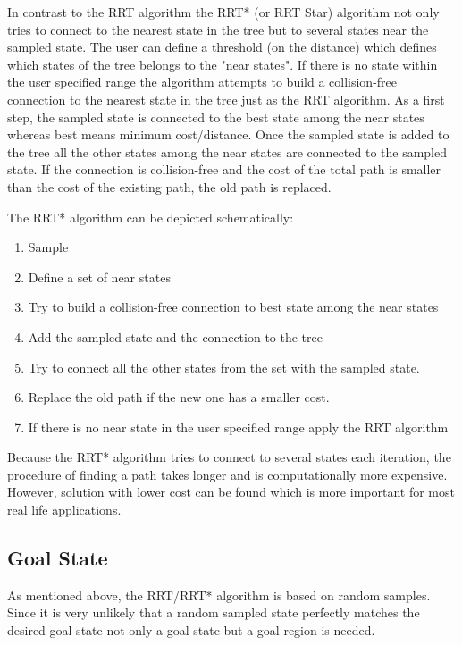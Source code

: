 In contrast to the RRT algorithm the RRT* (or RRT Star) algorithm not only tries to connect to the nearest state in the tree but to several states near the sampled state. The user can define a threshold (on the distance) which defines which states of the tree belongs to the "near states". If there is no state within the user specified range the algorithm attempts to build a collision-free connection to the nearest state in the tree just as the RRT algorithm.  \newline
As a first step, the sampled state is connected to the best state among the near states whereas best means minimum cost/distance. Once the sampled state is added to the tree all the other states among the near states are connected to the sampled state. If the connection is collision-free and the cost of the total path is smaller than the cost of the existing path, the old path is replaced. \newline

The RRT* algorithm can be depicted schematically:


\begin{enumerate}
  \item Sample
  \item Define a set of near states
  \item Try to build a collision-free connection to best state among the near states
  \item Add the sampled state and the connection to the tree 
  \item Try to connect all the other states from the set with the sampled state. 
  \item Replace the old path if the new one has a smaller cost.
  \item If there is no near state in the user specified range apply the RRT algorithm
\end{enumerate}


Because the RRT* algorithm tries to connect to several states each iteration, the procedure of finding a path takes longer and is computationally more expensive. However, solution with lower cost can be found which is more important for most real life applications.

\subsection{Goal State}

As mentioned above, the RRT/RRT* algorithm is based on random samples. Since it is very unlikely that a random sampled state perfectly matches the desired goal state not only a goal state but a goal region is needed. 




